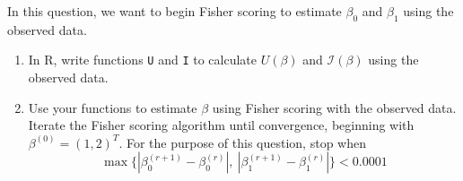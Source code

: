 \documentclass[11pt]{article}
\begin{document}
\begin{enumerate}
In this question, we want to begin Fisher scoring to estimate $\beta_0$ and $\beta_1$ using the observed data.

\begin{enumerate}
\item In R, write functions \verb;U; and \verb;I; to calculate $U(\beta)$ and $\mathcal{I}(\beta)$ using the observed data.

\item Use your functions to estimate $\beta$ using Fisher scoring with the observed data. Iterate the Fisher scoring algorithm until convergence, beginning with $\beta^{(0)} = (1, 2)^T$. For the purpose of this question, stop when 
$$\max \{ |\beta_0^{(r+1)} - \beta_0^{(r)}|, \ |\beta_1^{(r+1)} - \beta_1^{(r)}| \} < 0.0001$$
\end{enumerate}

\end{enumerate}
\end{document}
